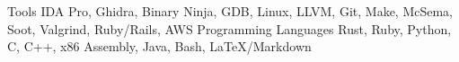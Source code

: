 \begin{cventries}
    \cvskilltwo 
    {Tools}
    {IDA Pro, Ghidra, Binary Ninja, GDB, Linux, LLVM, Git, Make, McSema, Soot, Valgrind, Ruby/Rails, AWS}
    \cvskilltwo 
    {Programming Languages}
    {Rust, Ruby, Python, C, C++, x86 Assembly, Java, Bash, LaTeX/Markdown}
\end{cventries}
